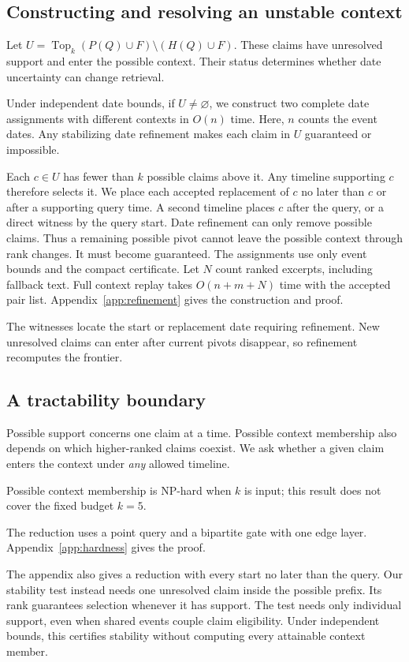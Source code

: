 \subsection{Constructing and resolving an unstable context}
Let $U=\operatorname{Top}_k(P(Q)\cup F)\setminus(H(Q)\cup F)$.
These claims have unresolved support and enter the possible context.
Their status determines whether date uncertainty can change retrieval.

\begin{theorem}
\label{thm:refinement}
Under independent date bounds, if $U\ne\varnothing$, we construct two complete date assignments with different contexts in $O(n)$ time.
Here, $n$ counts the event dates.
Any stabilizing date refinement makes each claim in $U$ guaranteed or impossible.
\end{theorem}

Each $c\in U$ has fewer than $k$ possible claims above it.
Any timeline supporting $c$ therefore selects it.
We place each accepted replacement of $c$ no later than $c$ or after a supporting query time.
A second timeline places $c$ after the query, or a direct witness by the query start.
Date refinement can only remove possible claims.
Thus a remaining possible pivot cannot leave the possible context through rank changes.
It must become guaranteed.
The assignments use only event bounds and the compact certificate.
Let $N$ count ranked excerpts, including fallback text.
Full context replay takes $O(n+m+N)$ time with the accepted pair list.
Appendix~\ref{app:refinement} gives the construction and proof.

The witnesses locate the start or replacement date requiring refinement.
New unresolved claims can enter after current pivots disappear, so refinement recomputes the frontier.

\subsection{A tractability boundary}
Possible support concerns one claim at a time.
Possible context membership also depends on which higher-ranked claims coexist.
We ask whether a given claim enters the context under \emph{any} allowed timeline.
\begin{theorem}
\label{thm:hardness}
Possible context membership is NP-hard when $k$ is input; this result does not cover the fixed budget $k=5$.
\end{theorem}
The reduction uses a point query and a bipartite gate with one edge layer.
Appendix~\ref{app:hardness} gives the proof.

The appendix also gives a reduction with every start no later than the query.
Our stability test instead needs one unresolved claim inside the possible prefix.
Its rank guarantees selection whenever it has support.
The test needs only individual support, even when shared events couple claim eligibility.
Under independent bounds, this certifies stability without computing every attainable context member.
